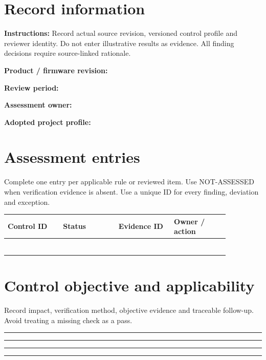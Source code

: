 \documentclass[10pt,letterpaper]{article}
\begin{document}
\makedoctitle
\makedocsummary
\section{Record information}
\textbf{Instructions:} Record actual source revision, versioned control profile and reviewer identity. Do not enter illustrative results as evidence. All finding decisions require source-linked rationale.\par\medskip
\noindent\textbf{Product / firmware revision:}\quad\hrulefill\par\vspace{11pt}
\noindent\textbf{Review period:}\quad\hrulefill\par\vspace{11pt}
\noindent\textbf{Assessment owner:}\quad\hrulefill\par\vspace{11pt}
\noindent\textbf{Adopted project profile:}\quad\hrulefill\par\vspace{11pt}
\section{Assessment entries}
Complete one entry per applicable rule or reviewed item. Use NOT-ASSESSED when verification evidence is absent. Use a unique ID for every finding, deviation and exception.\par\medskip
\begin{longtable}{|p{0.215\linewidth}|p{0.215\linewidth}|p{0.215\linewidth}|p{0.215\linewidth}|}
\hline
\textbf{Control ID} & \textbf{Status} & \textbf{Evidence ID} & \textbf{Owner / action}\\\hline
\endhead
\rule{0pt}{27pt} & & & \\\hline
\rule{0pt}{27pt} & & & \\\hline
\rule{0pt}{27pt} & & & \\\hline
\rule{0pt}{27pt} & & & \\\hline
\rule{0pt}{27pt} & & & \\\hline
\rule{0pt}{27pt} & & & \\\hline
\end{longtable}
\section{Control objective and applicability}
Record impact, verification method, objective evidence and traceable follow-up. Avoid treating a missing check as a pass.\par\medskip
\noindent\rule{\linewidth}{0.4pt}\par\vspace{16pt}
\noindent\rule{\linewidth}{0.4pt}\par\vspace{16pt}
\noindent\rule{\linewidth}{0.4pt}\par\vspace{16pt}
\noindent\rule{\linewidth}{0.4pt}\par\vspace{16pt}
\end{document}
